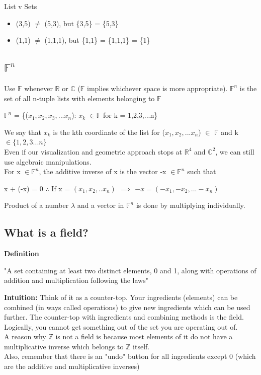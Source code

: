 \documentclass{article}
\begin{document}
List v Sets
\begin{itemize}
    \item (3,5) $\neq$ (5,3), but \{3,5\} = \{5,3\}
    \item (1,1) $\neq$ (1,1,1), but \{1,1\} = \{1,1,1\} = \{1\}
\end{itemize}

\subsection{$\mathbb{F}^n$}
Use $\mathbb{F}$ whenever $\mathbb{R}$ or $\mathbb{C}$ ($\mathbb{F}$ implies whichever space is more appropriate). $\mathbb{F}^n$ is the set of all n-tuple lists with elements belonging to $\mathbb{F}$ 
\begin{center}
    $\mathbb{F}^n$ = \{($x_1,x_2,x_3,...x_n$): $x_k$ $\in \mathbb{F}$ for k = 1,2,3,...n\}
\end{center}

We say that $x_k$ is the kth coordinate of the list for ($x_1,x_2,...x_n$) $\in$ $\mathbb{F}$ and k $\in \{1,2,3...n\}$ \\ 
Even if our visualization and geometric approach stops at $\mathbb{R}^4$ and $\mathbb{C}^2$, we can still use algebraic manipulations. \\ 
For x $\in \mathbb{F}^n$, the additive inverse of x is the vector -x $\in \mathbb{F}^n$ such that 
\begin{center}
    x + (-x) = 0
    $\therefore$ If x = $(x_1, x_2,..x_n)$ $\implies$ $-x = (-x_1,-x_2,...-x_n)$
\end{center}
Product of a number $\lambda$ and a vector in $\mathbb{F}^n$ is done by multiplying individually. 
\subsection{What is a field?}
\textbf{Definition} \\ 
\begin{center}
    "A set containing at least two distinct elements, 0 and 1, along with operations of addition and multiplication following the laws"
\end{center}
\textbf{Intuition:}
Think of it as a counter-top. Your ingredients (elements) can be combined (in ways called operations) to give new ingredients which can be used further. The counter-top with ingredients and combining methods is the field. \\
Logically, you cannot get something out of the set you are operating out of. \\
A reason why $\mathbb{Z}$ is not a field is because most elements of it do not have a multiplicative inverse which belongs to $\mathbb{Z}$ itself. \\
Also, remember that there is an "undo" button for all ingredients except 0 (which are the additive and multiplicative inverses) \\
\end{document}
